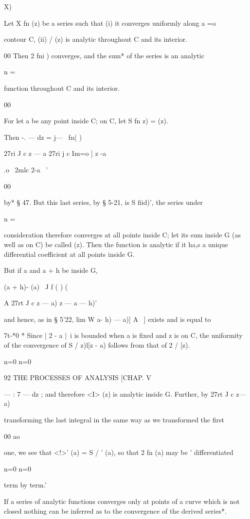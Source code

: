 {{ X)

Let X fn (z) be a series such that (i) it converges uniformly along a
=o

contour C, (ii) / (z) is analytic throughout C and its interior.

00 Then 2 fni ) converges, and the sum* of the series is an analytic

n =

function throughout C and its interior.

00

For let a be any point inside C; on C, let S fn z) = (z).

Then -. — dz = j— \ fn( )\

27ri J c z — a 27ri j c Im=o ] z -a

 .o \ 2mlc 2-a \ '

00

by* § 47. But this last series, by § 5-21, is S fiid)', the series
under

n =

consideration therefore converges at all points inside C; let its sum
inside G (as well as on C) be called (z). Then the function is
analytic if it ha,s a unique differential coefficient at all points
inside G.

But if a and a + h be inside G,

 (a + h)- (a) \ J f ( ) (

A 27rt J c z — a) z — a — h)'

and hence, as in § 5'22, lim W a- h) — a)] A~ ] exists and is equal to

7t-*0 * Since | 2 - a |~i is bounded when a is fixed and z is on C,
the uniformity of the convergence of S / z)l[z - a) follows from that
of 2 / [z).

n=0 n=0



92 THE PROCESSES OF ANALYSIS [CHAP. V

  — : 7 — dz ; and therefore <I> (z) is analytic inside G. Further, by
27rt J c z— a)

transforming the last integral in the same way as we transformed the
first

00 ao

one, we see that <!>' (a) = S / ' (a), so that 2 fn (a) may be '
differentiated

n=0 n=0

term by term.'

If a series of analytic functions converges only at points of a curve
which is not closed nothing can be inferred as to the convergence of
the derived series*.

}}
